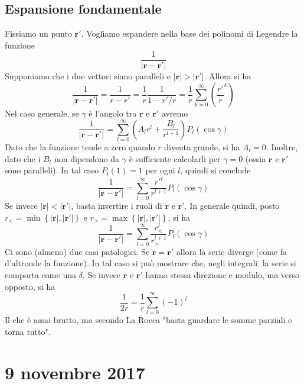 \documentclass[a4paper,11pt]{book}
\renewcommand{\vec}[1]{\mathbf{#1}}
\theoremstyle{theorem}
\theoremstyle{definition}
\begin{document}
\subsection{Espansione fondamentale}
Fissiamo un punto $\vec{r}'$. Vogliamo espandere nella base dei polinomi di Legendre la funzione
\[\frac{1}{|\vec{r}-\vec{r}'|}\]
Supponiamo che i due vettori siano paralleli e $|\vec{r}|>|\vec{r}'|$. Allora si ha
\[\frac{1}{|\vec{r}-\vec{r}'|}=\frac{1}{r-r'}=\frac{1}{r}\frac{1}{1-r'/r}=\frac{1}{r}\sum_{k=0}^{\infty}\left(\frac{r'}{r}^k\right)\]
Nel caso generale, se $\gamma$ è l'angolo tra $\vec{r}$ e $\vec{r}'$ avremo
\[\frac{1}{|\vec{r}-\vec{r}'|}=\sum_{l=0}^{\infty}\left(A_lr^l+\frac{B_l}{r^{l+1}}\right)P_l(\cos\gamma)\]
Dato che la funzione tende a zero quando $r$ diventa grande, si ha $A_l=0$. Inoltre, dato che i $B_l$ non dipendono da $\gamma$ è sufficiente calcolarli per $\gamma=0$ (ossia $\vec{r}$ e $\vec{r}'$ sono paralleli). In tal caso $P_l(1)=1$ per ogni $l$, quindi si conclude
\[\frac{1}{|\vec{r}-\vec{r}'|}=\sum_{l=0}^{\infty}\frac{r'^l}{r^{l+1}}P_l(\cos\gamma)\]
Se invece $|\vec{r}|<|\vec{r}'|$, basta invertire i ruoli di $\vec{r}$ e $\vec{r}'$. In generale quindi, posto $r_<=\min\left\{|\vec{r}|,|\vec{r}'|\right\}$ e $r_>=\max\left\{|\vec{r}|,|\vec{r}'|\right\}$, si ha
\[\frac{1}{|\vec{r}-\vec{r}'|}=\sum_{l=0}^{\infty}\frac{r_<^l}{r_>^{l+1}}P_l(\cos\gamma)\]
Ci sono (almeno) due casi patologici. Se $\vec{r}=\vec{r}'$ allora la serie diverge (come fa d'altronde la funzione). In tal caso si può mostrare che, negli integrali, la serie si comporta come una $\delta$. Se invece $\vec{r}$ e $\vec{r}'$ hanno stessa direzione e modulo, ma verso opposto, si ha
\[\frac{1}{2r}=\frac{1}{r}\sum_{l=0}^{\infty}(-1)^l\]
Il che è assai brutto, ma secondo La Rocca "basta guardare le somme parziali e torna tutto".
\newpage
\section{9 novembre 2017}
\end{document}
